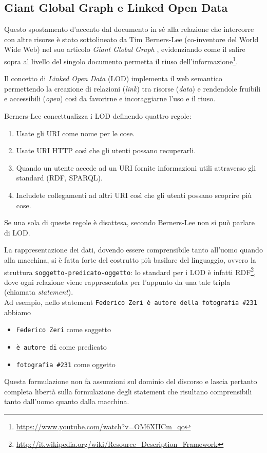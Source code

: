 \subsection{Giant Global Graph e Linked Open Data}
Questo spostamento d'accento dal documento in sé alla relazione che intercorre con altre risorse è stato sottolineato da Tim Berners-Lee (co-inventore del World Wide Web) nel suo articolo \emph{Giant Global Graph} \cite{3}, evidenziando come il salire sopra al livello del singolo documento permetta il riuso dell'informazione\footnote{\url{https://www.youtube.com/watch?v=OM6XIICm_qo}}.

Il concetto di \emph{Linked Open Data} (LOD) implementa il web semantico permettendo la creazione di relazioni (\emph{link}) tra risorse (\emph{data}) e rendendole fruibili e accessibili (\emph{open}) così da favorirne e incoraggiarne l'uso e il riuso.

Berners-Lee concettualizza i LOD definendo quattro regole:
\begin{enumerate}
\item Usate gli URI come nome per le cose.
\item Usate URI HTTP così che gli utenti possano recuperarli.
\item Quando un utente accede ad un URI fornite informazioni utili attraverso gli standard (RDF, SPARQL).
\item Includete collegamenti ad altri URI così che gli utenti possano scoprire più cose.
\end{enumerate}
Se una sola di queste regole è disattesa, secondo Berners-Lee non si può parlare di LOD. \cite{4}

La rappresentazione dei dati, dovendo essere comprensibile tanto all'uomo quando alla macchina, si è fatta forte del costrutto più basilare del linguaggio, ovvero la struttura \verb"soggetto-predicato-oggetto": lo standard per i LOD è infatti RDF\footnote{\url{http://it.wikipedia.org/wiki/Resource_Description_Framework}}, dove ogni relazione viene rappresentata per l'appunto da una tale tripla (chiamata \emph{statement}).\\
Ad esempio, nello statement \texttt{Federico Zeri è autore della fotografia \#231} abbiamo
\begin{itemize}
\item \verb"Federico Zeri" come soggetto
\item \verb"è autore di" come predicato
\item \verb"fotografia #231" come oggetto
\end{itemize}
Questa formulazione non fa assunzioni sul dominio del discorso e lascia pertanto completa libertà sulla formulazione degli statement che risultano comprensibili tanto dall'uomo quanto dalla macchina.

